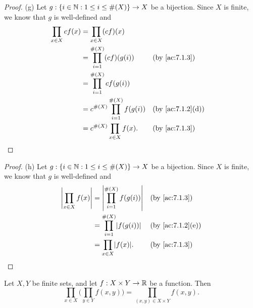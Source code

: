 \begin{proof}{(g)}
  Let \(g : \{i \in \mathbb{N} : 1 \leq i \leq \#(X)\} \to X\) be a bijection.
  Since \(X\) is finite, we know that \(g\) is well-defined and
  \begin{align*}
    \prod_{x \in X} cf(x) & = \prod_{x \in X} (cf)(x)                                                     \\
                          & = \prod_{i = 1}^{\#(X)} (cf)(g(i))        &  & \text{(by \cref{ac:7.1.3})}    \\
                          & = \prod_{i = 1}^{\#(X)} cf(g(i))                                              \\
                          & = c^{\#(X)} \prod_{i = 1}^{\#(X)} f(g(i)) &  & \text{(by \cref{ac:7.1.2}(d))} \\
                          & = c^{\#(X)} \prod_{x \in X} f(x).         &  & \text{(by \cref{ac:7.1.3})}
  \end{align*}
\end{proof}

\begin{proof}{(h)}
  Let \(g : \{i \in \mathbb{N} : 1 \leq i \leq \#(X)\} \to X\) be a bijection.
  Since \(X\) is finite, we know that \(g\) is well-defined and
  \begin{align*}
    \abs{\prod_{x \in X} f(x)} & = \abs{\prod_{i = 1}^{\#(X)} f(g(i))} &  & \text{(by \cref{ac:7.1.3})}    \\
                               & = \prod_{i = 1}^{\#(X)} \abs{f(g(i))} &  & \text{(by \cref{ac:7.1.2}(e))} \\
                               & = \prod_{x \in X} \abs{f(x)}.         &  & \text{(by \cref{ac:7.1.3})}
  \end{align*}
\end{proof}

\begin{ac}\label{ac:7.1.6}
  Let \(X, Y\) be finite sets, and let \(f : X \times Y \to \mathbb{R}\) be a function.
  Then
  \[
    \prod_{x \in X} \bigg(\prod_{y \in Y} f(x, y)\bigg) = \prod_{(x, y) \in X \times Y} f(x, y).
  \]
\end{ac}

